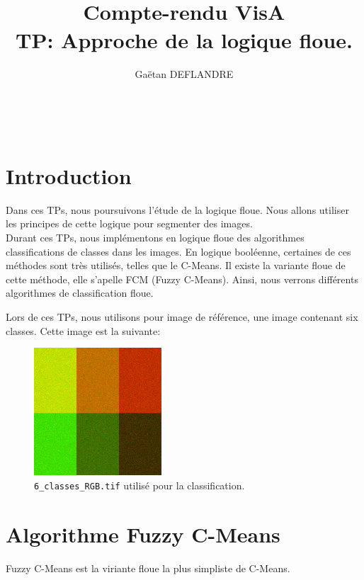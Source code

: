 \documentclass[a4paper,11pt]{article}
\title{
  \noindent\hrulefill \\
  \vspace{10mm}
  \textbf{Compte-rendu VisA} \\
  \vspace{5mm}
  TP: Approche de la logique floue.
}
\author{Gaëtan DEFLANDRE}
\begin{document}
\maketitle
\noindent\hrulefill \\


\section*{Introduction}

Dans ces TPs, nous poursuivons l'étude de la logique floue. Nous allons 
utiliser les principes de cette logique pour segmenter des images. \\

Durant ces TPs, nous implémentons en logique floue des algorithmes 
classifications de classes dans les images. En logique booléenne, 
certaines de ces méthodes sont très utilisés, telles que le C-Means. Il 
existe la variante floue de cette méthode, elle s'apelle FCM (Fuzzy 
C-Means). Ainsi, nous verrons différents algorithmes de classification 
floue.\\


\newpage



Lors de ces TPs, nous utilisons pour image de référence, une image 
contenant six classes. Cette image est la suivante:

\begin{figure}[H]
  \begin{center} 
    \includegraphics[width=180px]{../img/6_classes_RGB.png}
    \caption{\texttt{6\_classes\_RGB.tif} utilisé pour la classification.}
  \end{center}
\end{figure}

\section{Algorithme Fuzzy C-Means}

Fuzzy C-Means est la viriante floue la plus simpliste de C-Means.	
\end{document}
